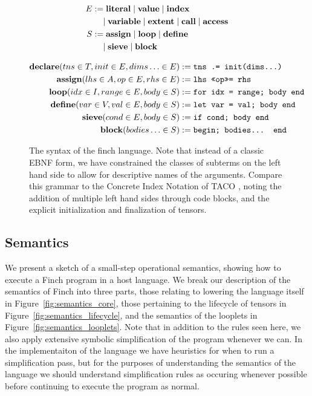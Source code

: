 \begin{figure}
\begin{minipage}{0.5\linewidth}
\begin{align*}
    E &:= \text{\textbf{literal}} \mid \text{\textbf{value}} \mid \text{\textbf{index}} \\
        &\quad \mid \text{\textbf{variable}} \mid \text{\textbf{extent}} \mid \text{\textbf{call}} \mid \text{\textbf{access}} \\
    S &:= \text{\textbf{assign}} \mid \text{\textbf{loop}} \mid \text{\textbf{define}} \\
        &\quad \mid \text{\textbf{sieve}} \mid \text{\textbf{block}} \\
\end{align*}
\end{minipage}%
\begin{align*}
    \text{\textbf{declare}}(tns \in T, init \in E, dims\ldots \in E) &:= \text{\texttt{tns .= init(dims...)}} \\
    \text{\textbf{assign}}(lhs \in A, op \in E, rhs \in E) &:= \text{\texttt{lhs <<op>>= rhs}} \\
    \text{\textbf{loop}}(idx \in I, range \in E, body \in S) &:= \text{\texttt{for idx = range; body end}} \\
    \text{\textbf{define}}(var \in V, val \in E, body \in S) &:= \text{\texttt{let var = val; body end}} \\
    \text{\textbf{sieve}}(cond \in E, body \in S) &:= \text{\texttt{if cond; body end}} \\
    \text{\textbf{block}}(bodies\ldots \in S) &:= \text{\texttt{begin; bodies... end}}
\end{align*}
\caption{The syntax of the finch language. Note that instead of a classic EBNF
form, we have constrained the classes of subterms on the left hand side to allow
for descriptive names of the arguments. Compare this grammar to the Concrete
Index Notation of TACO \cite[Figure~3]{kjolstad_tensor_2019}, noting the
addition of multiple left hand sides through code blocks, and the explicit
initialization and finalization of tensors.}\label{fig:syntax}
\end{figure}

\subsection{Semantics}

We present a sketch of a small-step operational semantics, showing how to execute a Finch program in a host language.
We break our description of the semantics of Finch into three parts, those
relating to lowering the language itself in Figure~\ref{fig:semantics_core},
those pertaining to the lifecycle of tensors in
Figure~\ref{fig:semantics_lifecycle}, and the semantics of the looplets in
Figure~\ref{fig:semantics_looplets}. Note that in addition to the rules seen
here, we also apply extensive symbolic simplification of the program whenever we
can. In the implementaiton of the language we have heuristics for when to run a
simplification pass, but for the purposes of understanding the semantics of the
language we should understand simplification rules as occuring whenever possible
before continuing to execute the program as normal.

